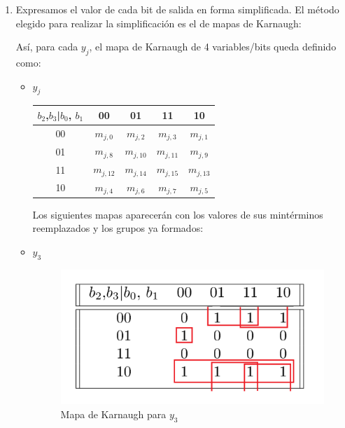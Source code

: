 \documentclass[../../informe/src/main.tex]{subfiles}
\begin{document}
\begin{enumerate}
 \item Expresamos el valor de cada bit de salida en forma simplificada. El método elegido para realizar la simplificación es el de mapas de Karnaugh: \par
 
Así, para cada $y_{j}$, el mapa de Karnaugh de 4 variables/bits queda definido como: 
\begin{itemize} 

\item $y_{j}$
 \begin{table}[H] %
\centering
 \begin{tabular}{||c c c c c||} 
 \hline
$b_{2}$,$b_{3}$|$b_{0}$, $b_{1}$ & 00 & 01 & 11 & 10\\ [0.5ex] 
 \hline\hline
00 & $m_{j,0}$ & $m_{j,2}$ & $m_{j,3}$ & $m_{j,1}$\\
01 & $m_{j,8}$ & $m_{j,10}$ & $m_{j,11}$ & $m_{j,9}$\\
11 & $m_{j,12}$ & $m_{j,14}$ & $m_{j,15}$ & $m_{j,13}$\\
10 & $m_{j,4}$ & $m_{j,6}$ & $m_{j,7}$ & $m_{j,5}$\\[1ex] 
\hline
\end{tabular}
\end{table}
Los siguientes mapas aparecerán con los valores de sus mintérminos reemplazados y los grupos ya formados:

\item $y_3$ 				

\begin{figure}[H]	%
	\centering
	\includegraphics[scale=0.5]{imagenes/karnaugh_mapa_y3.png}
	\caption{Mapa de Karnaugh para $y_3$}
	\label{fig:ej4_karnaugh_mapa_y3}
\end{figure}


\end{itemize}
\end{enumerate}
\end{document}
